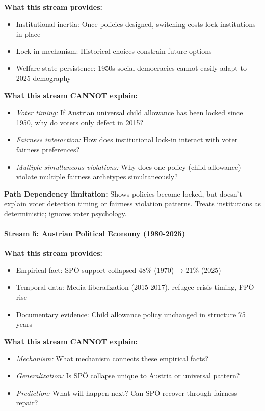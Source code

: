 \textbf{What this stream provides:}
\begin{itemize}[nosep]
\item Institutional inertia: Once policies designed, switching costs lock institutions in place
\item Lock-in mechanism: Historical choices constrain future options
\item Welfare state persistence: 1950s social democracies cannot easily adapt to 2025 demography
\end{itemize}

\textbf{What this stream CANNOT explain:}
\begin{itemize}[nosep]
\item \textit{Voter timing:} If Austrian universal child allowance has been locked since 1950,
why do voters only defect in 2015?
\item \textit{Fairness interaction:} How does institutional lock-in interact with voter fairness preferences?
\item \textit{Multiple simultaneous violations:} Why does one policy (child allowance) violate
multiple fairness archetypes simultaneously?
\end{itemize}

\textbf{Path Dependency limitation:} Shows policies become locked, but doesn't explain voter
detection timing or fairness violation patterns. Treats institutions as deterministic; ignores
voter psychology.

\paragraph{Stream 5: Austrian Political Economy (1980-2025)}

\textbf{What this stream provides:}
\begin{itemize}[nosep]
\item Empirical fact: SPÖ support collapsed 48\% (1970) → 21\% (2025)
\item Temporal data: Media liberalization (2015-2017), refugee crisis timing, FPÖ rise
\item Documentary evidence: Child allowance policy unchanged in structure 75 years
\end{itemize}

\textbf{What this stream CANNOT explain:}
\begin{itemize}[nosep]
\item \textit{Mechanism:} What mechanism connects these empirical facts?
\item \textit{Generalization:} Is SPÖ collapse unique to Austria or universal pattern?
\item \textit{Prediction:} What will happen next? Can SPÖ recover through fairness repair?
\end{itemize}

